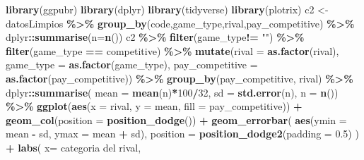 \documentclass[
]{article}
\newenvironment{Shaded}{\begin{snugshade}}{\end{snugshade}}
\newcommand{\AttributeTok}[1]{\textcolor[rgb]{0.13,0.29,0.53}{#1}}
\newcommand{\DecValTok}[1]{\textcolor[rgb]{0.00,0.00,0.81}{#1}}
\newcommand{\FloatTok}[1]{\textcolor[rgb]{0.00,0.00,0.81}{#1}}
\newcommand{\FunctionTok}[1]{\textcolor[rgb]{0.13,0.29,0.53}{\textbf{#1}}}
\newcommand{\NormalTok}[1]{#1}
\newcommand{\OtherTok}[1]{\textcolor[rgb]{0.56,0.35,0.01}{#1}}
\newcommand{\SpecialCharTok}[1]{\textcolor[rgb]{0.81,0.36,0.00}{\textbf{#1}}}
\newcommand{\StringTok}[1]{\textcolor[rgb]{0.31,0.60,0.02}{#1}}
\begin{document}
\begin{Shaded}
\begin{Highlighting}[]
\FunctionTok{library}\NormalTok{(ggpubr)}
\FunctionTok{library}\NormalTok{(dplyr)}
\FunctionTok{library}\NormalTok{(tidyverse)}
\FunctionTok{library}\NormalTok{(plotrix)}
\NormalTok{c2 }\OtherTok{\textless{}{-}}\NormalTok{ datosLimpios }\SpecialCharTok{\%\textgreater{}\%}
    \FunctionTok{group\_by}\NormalTok{(code,game\_type,rival,pay\_competitive) }\SpecialCharTok{\%\textgreater{}\%} 
\NormalTok{  dplyr}\SpecialCharTok{::}\FunctionTok{summarise}\NormalTok{(}\AttributeTok{n=}\FunctionTok{n}\NormalTok{())  }
\NormalTok{c2 }\SpecialCharTok{\%\textgreater{}\%}  
  \FunctionTok{filter}\NormalTok{(game\_type}\SpecialCharTok{!=} \StringTok{""}\NormalTok{) }\SpecialCharTok{\%\textgreater{}\%} 
  \FunctionTok{filter}\NormalTok{(game\_type }\SpecialCharTok{==} \StringTok{\textquotesingle{}competitive\textquotesingle{}}\NormalTok{) }\SpecialCharTok{\%\textgreater{}\%}
  \FunctionTok{mutate}\NormalTok{(}\AttributeTok{rival =} \FunctionTok{as.factor}\NormalTok{(rival),}
              \AttributeTok{game\_type =} \FunctionTok{as.factor}\NormalTok{(game\_type),}
         \AttributeTok{pay\_competitive =} \FunctionTok{as.factor}\NormalTok{(pay\_competitive)) }\SpecialCharTok{\%\textgreater{}\%}
  \FunctionTok{group\_by}\NormalTok{(pay\_competitive, rival) }\SpecialCharTok{\%\textgreater{}\%}
\NormalTok{  dplyr}\SpecialCharTok{::}\FunctionTok{summarise}\NormalTok{(}
    \AttributeTok{mean =} \FunctionTok{mean}\NormalTok{(n)}\SpecialCharTok{*}\DecValTok{100}\SpecialCharTok{/}\DecValTok{32}\NormalTok{,}
    \AttributeTok{sd =} \FunctionTok{std.error}\NormalTok{(n),}
    \AttributeTok{n =} \FunctionTok{n}\NormalTok{()) }\SpecialCharTok{\%\textgreater{}\%}
  \FunctionTok{ggplot}\NormalTok{(}\FunctionTok{aes}\NormalTok{(}\AttributeTok{x =}\NormalTok{ rival, }\AttributeTok{y =}\NormalTok{ mean, }\AttributeTok{fill =}\NormalTok{ pay\_competitive)) }\SpecialCharTok{+}
  \FunctionTok{geom\_col}\NormalTok{(}\AttributeTok{position =} \FunctionTok{position\_dodge}\NormalTok{()) }\SpecialCharTok{+}
  \FunctionTok{geom\_errorbar}\NormalTok{(}
    \FunctionTok{aes}\NormalTok{(}\AttributeTok{ymin =}\NormalTok{ mean }\SpecialCharTok{{-}}\NormalTok{ sd, }\AttributeTok{ymax =}\NormalTok{ mean }\SpecialCharTok{+}\NormalTok{ sd), }
    \AttributeTok{position =} \FunctionTok{position\_dodge2}\NormalTok{(}\AttributeTok{padding =} \FloatTok{0.5}\NormalTok{)}
\NormalTok{  ) }\SpecialCharTok{+}
  \FunctionTok{labs}\NormalTok{(}
    \AttributeTok{x=} \StringTok{\textquotesingle{}categoria del rival\textquotesingle{}}\NormalTok{,}

\end{Highlighting}
\end{Shaded}
\end{document}
